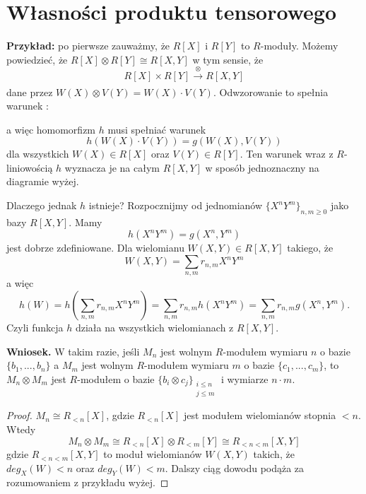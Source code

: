 \section{Własności produktu tensorowego}

\textbf{Przykład:} po pierwsze zauważmy, że $R[X]$ i $R[Y]$ to $R$-moduły. Możemy powiedzieć, że $R[X]\otimes R[Y]\cong R[X, Y]$ w tym sensie, że
$$R[X]\times R[Y]\xrightarrow[]{\otimes} R[X,Y]$$
dane przez $W(X)\otimes V(Y)=W(X)\cdot V(Y)$. Odwzorowanie to spełnia warunek \hyperref[warunek:z:12.3]{{\color{purple}\PHcat}}:

\begin{center}\end{center}
a więc homomorfizm $h$ musi spełniać warunek
$$h(W(X)\cdot V(Y))=g(W(X), V(Y))$$
dla wszystkich $W(X)\in R[X]$ oraz $V(Y)\in R[Y]$. Ten warunek wraz z $R$-liniowością $h$ wyznacza je na całym $R[X, Y]$ w sposób jednoznaczny na diagramie wyżej.

Dlaczego jednak $h$ istnieje? Rozpocznijmy od jednomianów $\{X^nY^m\}_{n,m\geq0}$ jako bazy $R[X,Y]$. Mamy
$$h(X^nY^m)=g(X^n,Y^m)$$
jest dobrze zdefiniowane. Dla wielomianu $W(X,Y)\in R[X, Y]$ takiego, że
$$W(X,Y)=\sum_{n,m}r_{n,m}X^nY^m$$
a więc
$$h(W)=h(\sum_{n,m}r_{n,m}X^nY^m)=\sum_{n,m}r_{n,m}h(X^nY^m)=\sum_{n,m}r_{n,m}g(X^n,Y^m).$$
Czyli funkcja $h$ działa na wszystkich wielomianach z $R[X,Y]$.
\medskip

\textbf{\large\color{blue}Wniosek.} W takim razie, jeśli $M_n$ jest wolnym $R$-modułem wymiaru $n$ o bazie $\{b_1,...,b_n\}$ a $M_m$ jest wolnym $R$-modułem wymiaru $m$ o bazie $\{c_1,...,c_m\}$, to $M_n\otimes M_m$ jest $R$-modułem o bazie $\{b_i\otimes c_j\}_{\substack{i\leq n\\j\leq m}}$ i wymiarze $n\cdot m$.

\begin{proof}
  $M_n\cong R_{<n}[X]$, gdzie $R_{<n}[X]$ jest modułem wielomianów stopnia $<n$. Wtedy
  $$M_n\otimes M_m\cong R_{<n}[X]\otimes R_{<m}[Y]\cong R_{<n<m}[X, Y]$$
  gdzie $R_{<n<m}[X,Y]$ to moduł wielomianów $W(X, Y)$ takich, że $deg_X(W)<n$ oraz $deg_Y(W)<m$. Dalszy ciąg dowodu podąża za rozumowaniem z przykładu wyżej.
\end{proof}
